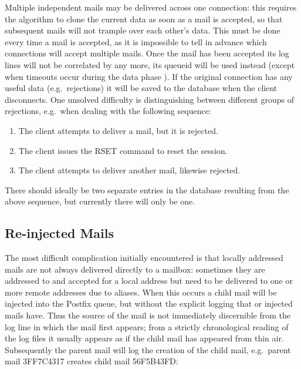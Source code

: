\label{connection reuse}

Multiple independent mails may be delivered across one connection: this
requires the algorithm to clone the current data as soon as a mail is
accepted, so that subsequent mails will not trample over each other's data.
This must be done every time a mail is accepted, as it is impossible to
tell in advance which connections will accept multiple mails.  Once the
mail has been accepted its log lines will not be correlated by
 any more, its queueid will be used instead (except when
timeouts occur during the data phase ).  If the original connection has any useful data (e.g.\ rejections)
it will be saved to the database when the client disconnects.  One unsolved
difficulty is distinguishing between different groups of rejections, e.g.\
when dealing with the following sequence:

\begin{enumerate}

    \item The client attempts to deliver a mail, but it is rejected.

    \item The client issues the RSET command to reset the 
        session.

    \item The client attempts to deliver another mail, likewise rejected.

\end{enumerate}

There should ideally be two separate entries in the database resulting from
the above sequence, but currently there will only be one.



\subsection{Re-injected Mails}

\label{Re-injected mails}

\label{tracking re-injected mail}

The most difficult complication initially encountered is that locally
addressed mails are not always delivered directly to a mailbox: sometimes
they are addressed to and accepted for a local address but need to be
delivered to one or more remote addresses due to aliases.  When this
occurs a child mail will be injected into the Postfix queue, but without
the explicit logging that \daemon{smtpd} or \daemon{postdrop} injected
mails have.  Thus the source of the mail is not immediately discernible
from the log line in which the mail first appears; from a strictly
chronological reading of the log files it usually appears as if the child
mail has appeared from thin air.  Subsequently the parent mail will log the
creation of the child mail, e.g.\ parent mail 3FF7C4317 creates child mail
56F5B43FD\@:

